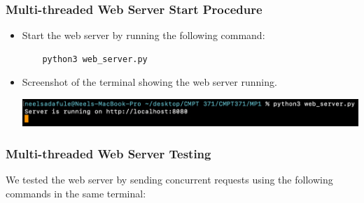 \documentclass{article}
\begin{document}
\subsubsection*{Multi-threaded Web Server Start Procedure}

\begin{itemize}
    \item Start the web server by running the following command:
    \begin{lstlisting}
    python3 web_server.py
    \end{lstlisting}
    \item Screenshot of the terminal showing the web server running.
    \begin{center}
        \includegraphics[width=\textwidth]{screenshots/web_server_start.png}  %
    \end{center}
\end{itemize}

\subsubsection*{Multi-threaded Web Server Testing}

We tested the web server by sending concurrent requests using the following commands in the same terminal:
\end{document}
